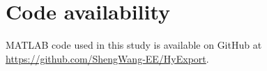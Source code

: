 \documentclass[pdflatex,sn-mathphys,Numbered]{sn-jnl}%
\begin{document}
\section*{Code availability}

MATLAB code used in this study is available on GitHub at \url{https://github.com/ShengWang-EE/HyExport}.


\begin{appendices}







\end{appendices}



\end{document}
